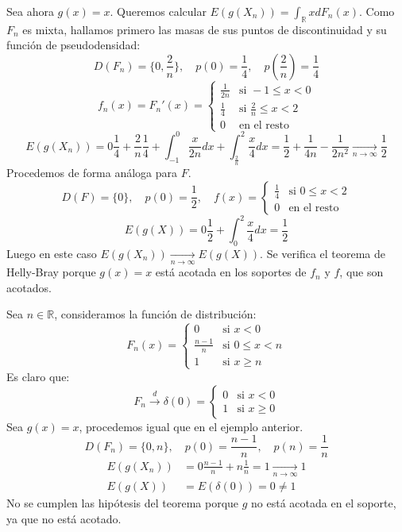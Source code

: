 \begin{example}
    Sea ahora $g(x) = x$.
    Queremos calcular $E(g(X_n)) = \int_\mathbb{R} x dF_n(x)$.
    Como $F_n$ es mixta, hallamos primero las masas de sus puntos de discontinuidad y su función de pseudodensidad:
    $$D(F_n) = \{0, \frac{2}{n}\}, \quad p(0) = \frac{1}{4}, \quad p(\frac{2}{n}) = \frac{1}{4}$$
    $$f_n(x) = F_n'(x) = \begin{cases}
            \frac{1}{2n} & \text{si } -1 \leq x < 0          \\
            \frac{1}{4}  & \text{si } \frac{2}{n} \leq x < 2 \\
            0            & \text{en el resto}
        \end{cases}$$
    $$E(g(X_n)) = 0 \frac{1}{4} + \frac{2}{n} \frac{1}{4} + \int_{-1}^0 \frac{x}{2n}dx + \int_\frac{2}{n}^2 \frac{x}{4}dx = \frac{1}{2} + \frac{1}{4n} - \frac{1}{2n^2} \xrightarrow[n \to \infty]{} \frac{1}{2}$$
    Procedemos de forma análoga para $F$.
    $$D(F) = \{0\}, \quad p(0) = \frac{1}{2}, \quad
        f(x) = \begin{cases}
            \frac{1}{4} & \text{si } 0 \leq x < 2 \\
            0           & \text{en el resto}
        \end{cases}$$
    $$E(g(X)) = 0 \frac{1}{2} + \int_0^2 \frac{x}{4}dx = \frac{1}{2}$$
    Luego en este caso $E(g(X_n)) \xrightarrow[n \to \infty]{} E(g(X))$.
    Se verifica el teorema de Helly-Bray porque $g(x) = x$ está acotada en los soportes de $f_n$ y $f$, que son acotados.
\end{example}

\begin{example}
    Sea $n \in \mathbb{R}$, consideramos la función de distribución:
    $$F_n(x) = \begin{cases}
            0             & \text{si } x < 0        \\
            \frac{n-1}{n} & \text{si } 0 \leq x < n \\
            1             & \text{si } x \geq n
        \end{cases}$$
    Es claro que:
    $$F_n \xrightarrow{d} \delta(0) = \begin{cases}
            0 & \text{si } x < 0    \\
            1 & \text{si } x \geq 0
        \end{cases}$$
    Sea $g(x) = x$, procedemos igual que en el ejemplo anterior.
    $$D(F_n) = \{0, n\}, \quad p(0) = \frac{n-1}{n}, \quad p(n) = \frac{1}{n}$$
    \begin{align*}
        E(g(X_n)) & = 0 \frac{n-1}{n} + n \frac{1}{n} = 1 \xrightarrow[n \to \infty]{} 1 \\
        E(g(X))   & = E(\delta(0)) = 0 \neq 1
    \end{align*}
    No se cumplen las hipótesis del teorema porque $g$ no está acotada en el soporte, ya que no está acotado.
\end{example}

